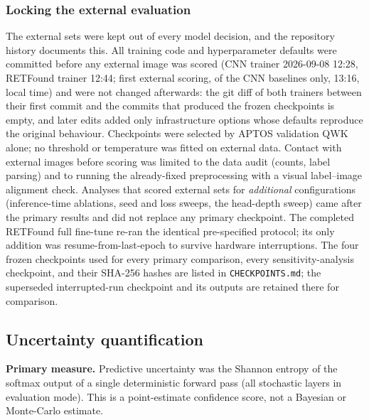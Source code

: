 \documentclass[journal]{IEEEtran}
\renewcommand{\_}{\origunderscore\allowbreak}
\begin{document}
\subsubsection{Locking the external evaluation}
\label{sec:methods-lock}
The external sets were kept out of every model decision, and the repository
history documents this. All training code and hyperparameter defaults were
committed before any external image was scored (CNN trainer 2026-09-08 12:28,
RETFound trainer 12:44; first external scoring, of the CNN baselines only,
13:16, local time) and were not changed afterwards: the git diff of both
trainers between their first commit and the commits that produced the frozen
checkpoints is empty, and later edits added only infrastructure options whose
defaults reproduce the original behaviour. Checkpoints were selected by APTOS
validation QWK alone; no threshold or temperature was fitted on external data.
Contact with external images before scoring was limited to the data audit
(counts, label parsing) and to running the already-fixed preprocessing with a
visual label--image alignment check. Analyses that scored external sets for
\emph{additional} configurations (inference-time ablations, seed and loss
sweeps, the head-depth sweep) came after the primary results and did not
replace any primary checkpoint. The completed RETFound full fine-tune
re-ran the identical pre-specified protocol; its only addition was
resume-from-last-epoch to survive hardware interruptions. The four frozen
checkpoints used for every primary comparison, every sensitivity-analysis
checkpoint, and their SHA-256 hashes are listed in \texttt{CHECKPOINTS.md};
the superseded interrupted-run checkpoint and its outputs are retained there for
comparison.

\subsection{Uncertainty quantification}
\label{sec:methods-unc}

\textbf{Primary measure.} Predictive uncertainty was the Shannon entropy of the
softmax output of a single deterministic forward pass (all stochastic layers in
evaluation mode). This is a point-estimate confidence score, not a Bayesian or
Monte-Carlo estimate.
\end{document}
